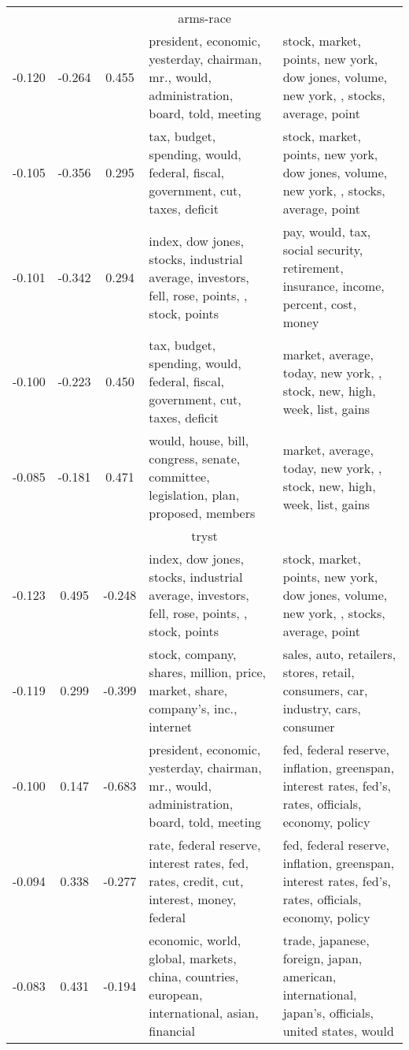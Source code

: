 \begin{tabular}{cccp{5cm}p{5cm}}
\midrule
\multicolumn{5}{c}{arms-race}\\
-0.120 & -0.264 & 0.455 & president, economic, yesterday, chairman, mr., would, administration, board, told, meeting & stock, market, points, new york, dow jones, volume, new york, , stocks, average, point \\
-0.105 & -0.356 & 0.295 & tax, budget, spending, would, federal, fiscal, government, cut, taxes, deficit & stock, market, points, new york, dow jones, volume, new york, , stocks, average, point \\
-0.101 & -0.342 & 0.294 & index, dow jones, stocks, industrial average, investors, fell, rose, points, , stock, points & pay, would, tax, social security, retirement, insurance, income, percent, cost, money \\
-0.100 & -0.223 & 0.450 & tax, budget, spending, would, federal, fiscal, government, cut, taxes, deficit & market, average, today, new york, , stock, new, high, week, list, gains \\
-0.085 & -0.181 & 0.471 & would, house, bill, congress, senate, committee, legislation, plan, proposed, members & market, average, today, new york, , stock, new, high, week, list, gains \\
\midrule
\multicolumn{5}{c}{tryst}\\
-0.123 & 0.495 & -0.248 & index, dow jones, stocks, industrial average, investors, fell, rose, points, , stock, points & stock, market, points, new york, dow jones, volume, new york, , stocks, average, point \\
-0.119 & 0.299 & -0.399 & stock, company, shares, million, price, market, share, company's, inc., internet & sales, auto, retailers, stores, retail, consumers, car, industry, cars, consumer \\
-0.100 & 0.147 & -0.683 & president, economic, yesterday, chairman, mr., would, administration, board, told, meeting & fed, federal reserve, inflation, greenspan, interest rates, fed's, rates, officials, economy, policy \\
-0.094 & 0.338 & -0.277 & rate, federal reserve, interest rates, fed, rates, credit, cut, interest, money, federal & fed, federal reserve, inflation, greenspan, interest rates, fed's, rates, officials, economy, policy \\
-0.083 & 0.431 & -0.194 & economic, world, global, markets, china, countries, european, international, asian, financial & trade, japanese, foreign, japan, american, international, japan's, officials, united states, would \\
\bottomrule
\end{tabular}
